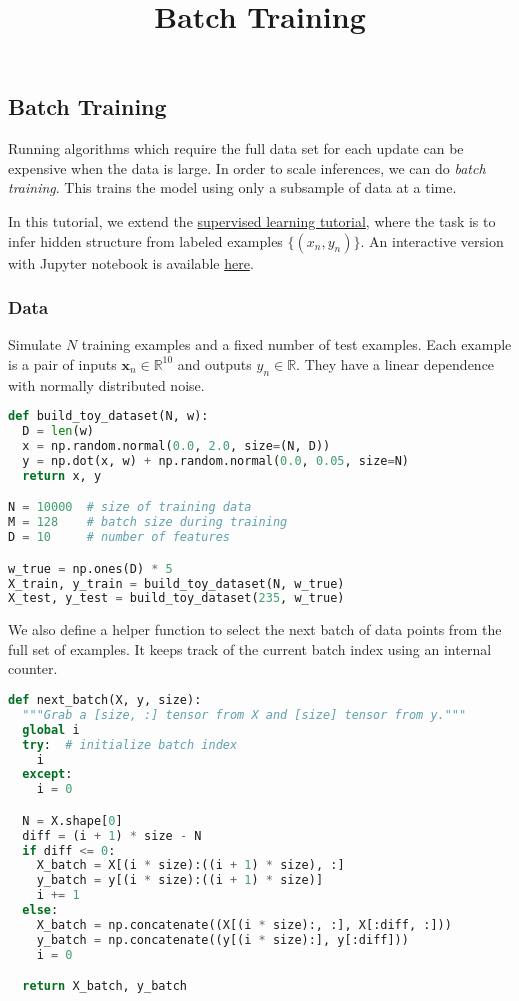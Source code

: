 \title{Batch Training}

\subsection{Batch Training}

Running algorithms which require the full data set for each update
can be expensive when the data is large. In order to scale inferences,
we can do \emph{batch training}. This trains the model using
only a subsample of data at a time.

In this tutorial, we extend the
\href{http://edwardlib.org/tutorials/supervised-regression}
{supervised learning tutorial},
where the task is to infer hidden structure from
labeled examples $\{(x_n, y_n)\}$.
An interactive version with Jupyter notebook is available
\href{http://nbviewer.jupyter.org/github/blei-lab/edward/blob/master/notebooks/batch_training.ipynb}{here}.

\subsubsection{Data}

Simulate $N$ training examples and a fixed number of test examples.
Each example is a pair of inputs $\mathbf{x}_n\in\mathbb{R}^{10}$ and
outputs $y_n\in\mathbb{R}$. They have a linear dependence with
normally distributed noise.

\begin{lstlisting}[language=Python]
def build_toy_dataset(N, w):
  D = len(w)
  x = np.random.normal(0.0, 2.0, size=(N, D))
  y = np.dot(x, w) + np.random.normal(0.0, 0.05, size=N)
  return x, y

N = 10000  # size of training data
M = 128    # batch size during training
D = 10     # number of features

w_true = np.ones(D) * 5
X_train, y_train = build_toy_dataset(N, w_true)
X_test, y_test = build_toy_dataset(235, w_true)
\end{lstlisting}

We also define a helper function to select the next batch of data points
from the full set of examples. It keeps track of the current batch index
using an internal counter.

\begin{lstlisting}[language=Python]
def next_batch(X, y, size):
  """Grab a [size, :] tensor from X and [size] tensor from y."""
  global i
  try:  # initialize batch index
    i
  except:
    i = 0

  N = X.shape[0]
  diff = (i + 1) * size - N
  if diff <= 0:
    X_batch = X[(i * size):((i + 1) * size), :]
    y_batch = y[(i * size):((i + 1) * size)]
    i += 1
  else:
    X_batch = np.concatenate((X[(i * size):, :], X[:diff, :]))
    y_batch = np.concatenate((y[(i * size):], y[:diff]))
    i = 0

  return X_batch, y_batch
\end{lstlisting}


